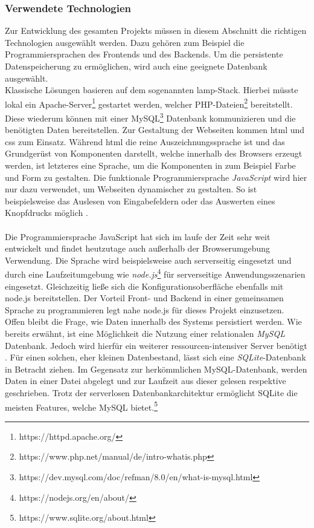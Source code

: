\subsubsection{Verwendete Technologien}
Zur Entwicklung des gesamten Projekts müssen in diesem Abschnitt die richtigen Technologien ausgewählt werden. Dazu gehören zum Beispiel die Programmiersprachen des Frontends und des Backends. Um die persistente Datenspeicherung zu ermöglichen, wird auch eine geeignete Datenbank ausgewählt. \\
Klassische Lösungen basieren auf dem sogenannten \gls{lamp}-Stack. Hierbei müsste lokal ein Apache-Server\footnote{https://httpd.apache.org/} gestartet werden, welcher PHP-Dateien\footnote{https://www.php.net/manual/de/intro-whatis.php} bereitstellt. Diese wiederum können mit einer MySQL\footnote{https://dev.mysql.com/doc/refman/8.0/en/what-is-mysql.html} Datenbank kommunizieren und die benötigten Daten bereitstellen. Zur Gestaltung der Webseiten kommen \gls{html} und \gls{css} zum Einsatz. Während \gls{html} die reine Auszeichnungssprache ist und das Grundgerüst von Komponenten darstellt, welche innerhalb des Browsers erzeugt werden, ist letzteres eine Sprache, um die Komponenten in zum Beispiel Farbe und Form zu gestalten. Die funktionale Programmiersprache \textit{JavaScript} wird hier nur dazu verwendet, um Webseiten dynamischer zu gestalten. So ist beispielsweise das Auslesen von Eingabefeldern oder das Auswerten eines Knopfdrucks möglich \cite{Gerner.2006}. \\ \\ Die Programmiersprache JavaScript hat sich im laufe der Zeit sehr weit entwickelt und findet heutzutage auch außerhalb der Browserumgebung Verwendung. Die Sprache wird beispielsweise auch serverseitig eingesetzt und durch eine Laufzeitumgebung wie \textit{node.js}\footnote{https://nodejs.org/en/about/} für serverseitige Anwendungsszenarien eingesetzt. \cite{Resig.2016} Gleichzeitig ließe sich die Konfigurationsoberfläche ebenfalls mit node.js bereitstellen. Der Vorteil Front- und Backend in einer gemeinsamen Sprache zu programmieren legt nahe node.js für dieses Projekt einzusetzen. \\ Offen bleibt die Frage, wie Daten innerhalb des Systems persistiert werden. Wie bereits erwähnt, ist eine Möglichkeit die Nutzung einer relationalen \textit{MySQL} Datenbank. Jedoch wird hierfür ein weiterer ressourcen-intensiver Server benötigt \cite{Gerner.2006}. Für einen solchen, eher kleinen Datenbestand, lässt sich eine \textit{SQLite}-Datenbank in Betracht ziehen. Im Gegensatz zur herkömmlichen MySQL-Datenbank, werden Daten in einer Datei abgelegt und zur Laufzeit aus dieser gelesen respektive geschrieben. Trotz der serverlosen Datenbankarchitektur ermöglicht SQLite die meisten Features, welche MySQL bietet.\footnote{https://www.sqlite.org/about.html}

